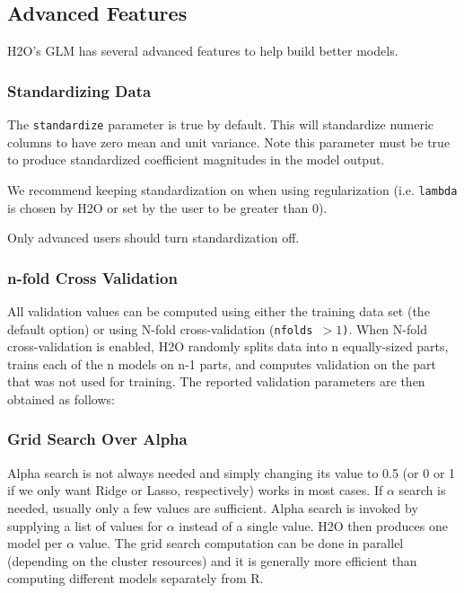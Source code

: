 \subsection{Advanced Features}

H2O's GLM has several advanced features to help build better models.

\subsubsection{Standardizing Data}

The \texttt{standardize} parameter is true by default.  This will standardize numeric columns to have zero mean and
unit variance.  Note this parameter must be true to produce standardized coefficient magnitudes in the model
output.

We recommend keeping standardization on when using regularization (i.e. \texttt{lambda} is chosen by H2O or set by
the user to be greater than 0).

Only advanced users should turn standardization off.

\subsubsection{n-fold Cross Validation}

All validation values can be computed using either the training data set (the default option) or using N-fold
cross-validation (\texttt{nfolds $> 1$)}. When N-fold cross-validation is enabled, H2O randomly splits data into n
equally-sized parts, trains each of the n models on n-1 parts, and computes validation on the part that was not
used for training. The reported validation parameters are then obtained as follows:

\subsubsection{Grid Search Over Alpha}

Alpha search is not always needed and simply changing its value to 0.5 (or 0 or 1 if we only want Ridge or Lasso,
respectively) works in most cases. If $\alpha$ search is needed, usually only a few values are sufficient. Alpha
search is invoked by supplying a list of values for $\alpha$ instead of a single value. H2O then produces one model
per $\alpha$ value. The grid search computation can be done in parallel (depending on the cluster resources) and it
is generally more efficient than computing different models separately from R.

